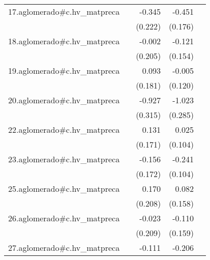 {\begin{longtable}{l*{4}{D{.}{.}{-1}}}
\addlinespace
17.aglomerado#c.hv\_matpreca&                     &      -0.345         &      -0.451\sym{*}  &                     \\
            &                     &     (0.222)         &     (0.176)         &                     \\
\addlinespace
18.aglomerado#c.hv\_matpreca&                     &      -0.002         &      -0.121         &                     \\
            &                     &     (0.205)         &     (0.154)         &                     \\
\addlinespace
19.aglomerado#c.hv\_matpreca&                     &       0.093         &      -0.005         &                     \\
            &                     &     (0.181)         &     (0.120)         &                     \\
\addlinespace
20.aglomerado#c.hv\_matpreca&                     &      -0.927\sym{**} &      -1.023\sym{***}&                     \\
            &                     &     (0.315)         &     (0.285)         &                     \\
\addlinespace
22.aglomerado#c.hv\_matpreca&                     &       0.131         &       0.025         &                     \\
            &                     &     (0.171)         &     (0.104)         &                     \\
\addlinespace
23.aglomerado#c.hv\_matpreca&                     &      -0.156         &      -0.241\sym{*}  &                     \\
            &                     &     (0.172)         &     (0.104)         &                     \\
\addlinespace
25.aglomerado#c.hv\_matpreca&                     &       0.170         &       0.082         &                     \\
            &                     &     (0.208)         &     (0.158)         &                     \\
\addlinespace
26.aglomerado#c.hv\_matpreca&                     &      -0.023         &      -0.110         &                     \\
            &                     &     (0.209)         &     (0.159)         &                     \\
\addlinespace
27.aglomerado#c.hv\_matpreca&                     &      -0.111         &      -0.206\sym{***}&                     \\

\end{longtable}}
